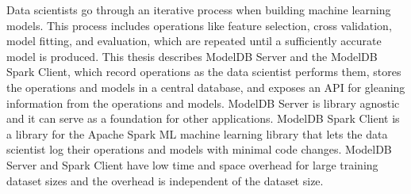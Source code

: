 % 
% 
%
Data scientists go through an iterative process when building machine learning
models. This process includes operations like feature selection, cross validation, 
model fitting, and evaluation, which are repeated until a sufficiently accurate 
model is produced. This thesis describes ModelDB Server and the ModelDB Spark Client,
which record operations as the data scientist performs them, stores the operations
and models in a central database, and exposes an API for gleaning information from the operations and models. 
ModelDB Server is library agnostic and it can serve as a foundation for other applications.
ModelDB Spark Client is a library for the Apache Spark ML machine learning library that 
lets the data scientist log their operations and models with minimal code changes.
ModelDB Server and Spark Client have low time and space overhead for large training
dataset sizes and the overhead is independent of the dataset size.

